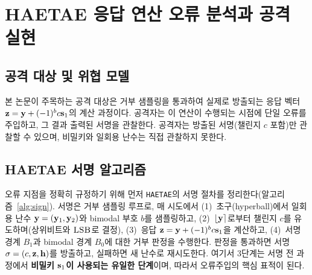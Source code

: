 \section{HAETAE 응답 연산 오류 분석과 공격 실현}
\label{sec:fault}\label{sec:attack}

\subsection{공격 대상 및 위협 모델}
본 논문이 주목하는 공격 대상은 거부 샘플링을 통과하여 실제로 방출되는 응답 벡터
$\mathbf{z}=\mathbf{y}+(-1)^b c\mathbf{s}_1$의 계산 과정이다. 공격자는 이 연산이 수행되는 시점에 단일 오류를
주입하고, 그 결과 출력된 서명을 관찰한다. 공격자는 방출된 서명(챌린지 $c$ 포함)만 관찰할 수 있으며,
비밀키와 일회용 난수는 직접 관찰하지 못한다.

\subsection{HAETAE 서명 알고리즘}
\label{subsec:sign-alg}
오류 지점을 정확히 규정하기 위해 먼저 \texttt{HAETAE}의 서명 절차를 정리한다(알고리즘~\ref{alg:sign}).
서명은 거부 샘플링 루프로, 매 시도에서 (1)~초구(hyperball)에서 일회용 난수 $\mathbf{y}=(\mathbf{y}_1,\mathbf{y}_2)$와
bimodal 부호 $b$를 샘플링하고, (2)~$\lfloor\mathbf{y}\rceil$로부터 챌린지 $c$를 유도하며(상위비트와
$\textsc{LSB}$로 결정), (3)~응답 $\mathbf{z}=\mathbf{y}+(-1)^b c\mathbf{s}_1$을 계산하고, (4)~서명 경계 $B_1$과
bimodal 경계 $B_0$에 대한 거부 판정을 수행한다. 판정을 통과하면 서명 $\sigma=(c,\mathbf{z},\mathbf{h})$를
방출하고, 실패하면 새 난수로 재시도한다. 여기서 3단계는 서명 전 과정에서 \textbf{비밀키 $\mathbf{s}_1$이
사용되는 유일한 단계}이며, 따라서 오류주입의 핵심 표적이 된다.

